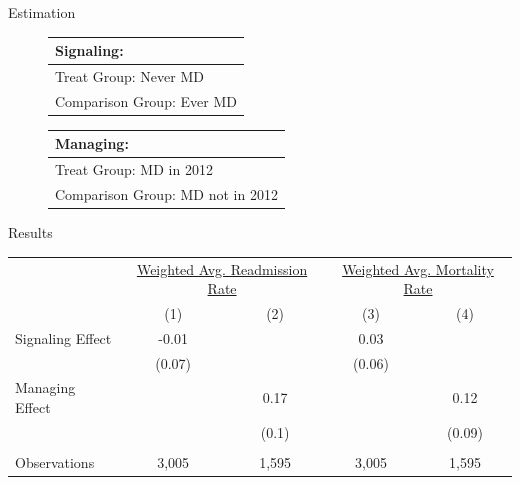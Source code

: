 \documentclass[notes,11pt, aspectratio=169]{beamer}
\begin{document}
\begin{frame}{Estimation}
\large
    \begin{figure}[ht!]
\begin{center}
 
 \begin{tabular}{| m{15em} |}
 \hline \vspace{1mm}
 \textbf{Signaling:}\\ [0.5ex]
 \hline\hline 
 \vspace{2mm}
 Treat Group:  \hspace{15mm} Never MD \\
 \vspace{2mm}
 Comparison Group: \hspace{3mm} Ever MD  \\
 [1ex]
 \hline
 \end{tabular}
\hfil   %
 \begin{tabular}{|m{18em}|}
 \hline \vspace{1mm}
 \textbf{Managing:}\\ [0.5ex]
 \hline\hline
 \vspace{2mm}
 Treat Group: \hspace{11mm} MD in 2012 \\
 \vspace{2mm}
 Comparison Group:  MD not in 2012  \\
 [1ex]
 \hline
 \end{tabular}
 
\end{center}
 \end{figure}

\end{frame}

\begin{frame}{Results}
    \begin{table}[ht!]
\centering
\begin{tabular}[t]{lcccc}
\toprule
\multicolumn{1}{c}{ } & \multicolumn{2}{c}{\underline{Weighted Avg. Readmission Rate}} & \multicolumn{2}{c}{\underline{Weighted Avg. Mortality Rate}} \\
 & (1) & (2) & (3) & (4)\\
\midrule
Signaling Effect & -0.01 &  & 0.03 & \\
 & (0.07) &  & (0.06) & \\
Managing Effect &  & 0.17 &  & 0.12\\
 &  & (0.1) &  & (0.09)\\
 &  &  &  & \\
Observations & 3,005 & 1,595 & 3,005 & 1,595\\
\bottomrule
\end{tabular}
\end{table}
\end{frame}
\end{document}
